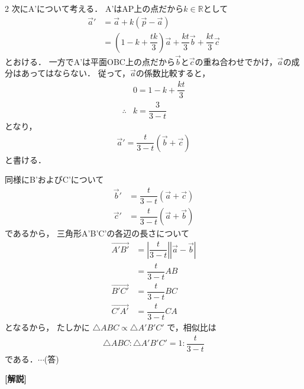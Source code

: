 \documentclass[../../main.tex]{subfiles}
\begin{document}
\begin{multicols}{2}
  次にA'について考える．
  A'はAP上の点だから$k \in \mathbb{R}$として
  \begin{align}
    \vec{a}'
    & = \vec{a}+k(\vec{p}-\vec{a}) \\
    & = \left(1-k+\dfrac{tk}{3}\right)\vec{a}+\dfrac{kt}{3}\vec{b} +\dfrac{kt}{3}\vec{c}
  \end{align}
  とおける．
  一方でA'は平面OBC上の点だから$\vec{b}$と$\vec{c}$の重ね合わせでかけ，$\vec{a}$の成分はあってはならない．
  従って，$\vec{a}$の係数比較すると，
  \begin{align}
    & 0 = 1-k+\dfrac{kt}{3} \\
    \therefore
    & k = \dfrac{3}{3-t}
  \end{align}
  となり，
  \begin{align}
    \vec{a}' = \dfrac{t}{3-t}(\vec{b}+\vec{c})
  \end{align}
  と書ける．

  同様にB'およびC'について
  \begin{align}
    \vec{b}' & = \dfrac{t}{3-t}(\vec{a}+\vec{c}) \\
    \vec{c}' & = \dfrac{t}{3-t}(\vec{a}+\vec{b})
  \end{align}
  であるから，
  三角形A'B'C'の各辺の長さについて
  \begin{align}
    \overrightarrow{A'B'} & = \left|\dfrac{t}{3-t}\right||\vec{a}-\vec{b}| \\
    & = \dfrac{t}{3-t} AB                            \\
    \overrightarrow{B'C'} & = \dfrac{t}{3-t} BC                            \\
    \overrightarrow{C'A'} & = \dfrac{t}{3-t} CA
  \end{align}
  となるから，
  たしかに $\triangle ABC \propto \triangle A'B'C'$ で，相似比は
  \begin{align}
    \triangle ABC : \triangle A'B'C' = 1 : \dfrac{t}{3-t}
  \end{align}
  である．$\cdots$(答)

  {\bf [解説]}
  \newpage
\end{multicols}
\end{document}
